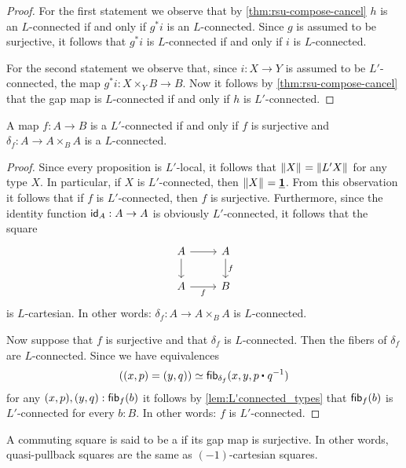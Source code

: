 \begin{proof}
For the first statement we observe that by \cref{thm:rsu-compose-cancel} $h$ is an $L$-connected if and only if $g^\ast i$ is an $L$-connected. Since $g$ is assumed to be surjective, it follows that $g^\ast i$ is $L$-connected if and only if $i$ is $L$-connected.

For the second statement we observe that, since $i:X\to Y$ is assumed to be $L'$-connected, the map $g^\ast i:X\times_Y B\to B$. Now it follows by \cref{thm:rsu-compose-cancel} that the gap map is $L$-connected if and only if $h$ is $L'$-connected.
\end{proof}

\begin{cor}\label{cor:L'connected_maps}
A map $f:A\to B$ is a $L'$-connected if and only if $f$ is surjective and $\delta_f:A\to A\times_B A$ is a $L$-connected.
\end{cor}

\begin{proof}
Since every proposition is $L'$-local, it follows that $\brck{X}=\brck{L'X}$ for any type $X$. In particular, if $X$ is $L'$-connected, then $\brck{X}=\unit$. From this observation it follows that if $f$ is $L'$-connected, then $f$ is surjective. Furthermore, since the identity function $\idfunc[A]:A\to A$ is obviously $L'$-connected, it follows that the square
\begin{equation*}
\begin{tikzcd}
A \arrow[d] \arrow[r] & A \arrow[d,"f"] \\
A \arrow[r,swap,"f"] & B
\end{tikzcd}
\end{equation*}
is $L$-cartesian. In other words: $\delta_f:A\to A\times_B A$ is $L$-connected.

Now suppose that $f$ is surjective and that $\delta_f$ is $L$-connected. Then the fibers of $\delta_f$ are $L$-connected. Since we have equivalences
\begin{equation*}
((x,p)=(y,q))\eqvsym \fib{\delta_f}{x,y,\ct{p}{q^{-1}}}
\end{equation*}
for any $(x,p),(y,q):\fib{f}{b}$ it follows by \cref{lem:L'connected_types} that $\fib{f}{b}$ is $L'$-connected for every $b:B$. In other words: $f$ is $L'$-connected.
\end{proof}

A commuting square is said to be a  if its gap map is surjective. In other words, quasi-pullback squares are the same as $(-1)$-cartesian squares.


